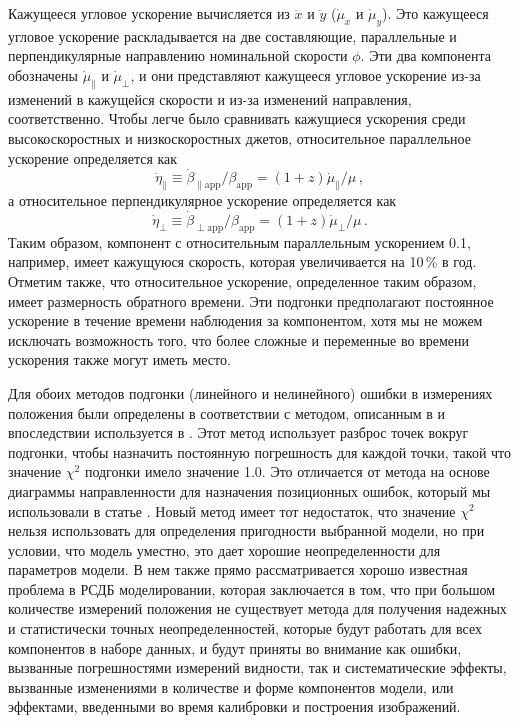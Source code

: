 Кажущееся угловое ускорение вычисляется из $\ddot{x}$ и $\ddot{y}$ ($\dot{\mu}_x$ и $\dot{\mu}_y$).
Это кажущееся угловое ускорение раскладывается на две составляющие, параллельные и перпендикулярные
направлению номинальной скорости $\phi$. Эти два компонента обозначены $\dot{\mu}_{\parallel}$ и
$\dot{\mu}_{\perp}$, и они представляют кажущееся угловое ускорение из-за изменений в кажущейся
скорости и из-за изменений направления, соответственно. Чтобы легче было сравнивать кажущиеся
ускорения среди высокоскоростных и низкоскоростных джетов, относительное параллельное ускорение
определяется как
\begin{equation}
\label{eq:rdv_relpar}
\dot{\eta}_{\parallel}\equiv
\dot{\beta}_\mathrm{\parallel app}/\beta_\mathrm{app}=(1+z)\dot{\mu}_{\parallel}/\mu\,,
\end{equation}
а относительное перпендикулярное ускорение определяется как
\begin{equation}
\label{eq:rdv_relperp}
\dot{\eta}_{\perp}\equiv
\dot{\beta}_\mathrm{\perp app}/\beta_\mathrm{app}=(1+z)\dot{\mu}_{\perp}/\mu\,.
\end{equation}
Таким образом, компонент с относительным параллельным ускорением 0.1, например, имеет кажущуюся
скорость, которая увеличивается на 10\,\% в год. Отметим также, что относительное ускорение,
определенное таким образом, имеет размерность обратного времени. Эти подгонки предполагают
постоянное ускорение в течение времени наблюдения за компонентом, хотя мы не можем исключать
возможность того, что более сложные и переменные во времени ускорения также могут иметь место.

Для обоих методов подгонки (линейного и нелинейного) ошибки в измерениях положения были определены
в соответствии с методом, описанным в \cite{Homan_2001} и впоследствии используется в
\cite{Lister_2009b,Homan_2009}. Этот метод использует разброс точек вокруг подгонки, чтобы
назначить постоянную погрешность для каждой точки, такой что значение $\chi^{2}$
подгонки имело значение 1.0. Это отличается от метода на основе диаграммы направленности для
назначения позиционных ошибок, который мы использовали в статье \cite{Piner_2007}. Новый метод
имеет тот недостаток, что значение $\chi^{2}$ нельзя использовать для определения пригодности
выбранной модели, но при условии, что модель уместно, это дает хорошие неопределенности для
параметров модели. В нем также прямо рассматривается хорошо известная проблема в РСДБ моделировании,
которая заключается в том, что при большом количестве измерений положения не существует метода для
получения надежных и статистически точных неопределенностей, которые будут работать для всех
компонентов в наборе данных, и будут приняты во внимание как ошибки, вызванные погрешностями
измерений видности, так и систематические эффекты, вызванные изменениями в количестве и форме
компонентов модели, или эффектами, введенными во время калибровки и построения изображений.

